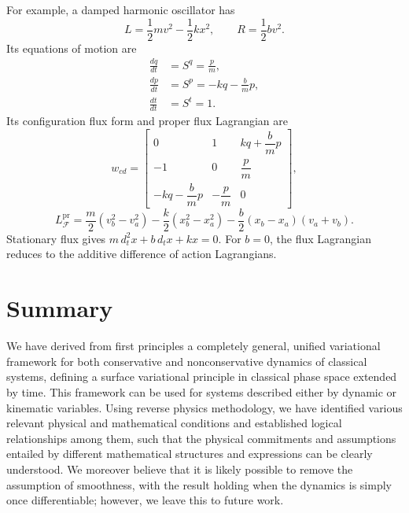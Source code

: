 \documentclass[nofootinbib,aps,pre]{revtex4-2}
\begin{document}
For example, a damped harmonic oscillator has
\begin{equation}
	L=\frac12 mv^2-\frac12 kx^2,
	\qquad R=\frac12 bv^2.
\end{equation}
Its equations of motion are
\begin{equation}
	\begin{aligned}
		\frac{dq}{dt}&=S^q=\frac{p}{m},\\
		\frac{dp}{dt}&=S^p=-kq-\frac{b}{m}p,\\
		\frac{dt}{dt}&=S^t=1.
	\end{aligned}
\end{equation}
Its configuration flux form and proper flux Lagrangian are
\begin{equation}
	w_{cd}=
	\begin{bmatrix}
		0 & 1 & kq+\dfrac{b}{m}p\\
		-1 & 0 & \dfrac{p}{m}\\
		-kq-\dfrac{b}{m}p & -\dfrac{p}{m} & 0
	\end{bmatrix},
\end{equation}
\begin{equation}
	L_{\mathcal F}^{\mathrm{pr}}
	=\frac m2(v_b^2-v_a^2)
	-\frac k2(x_b^2-x_a^2)
	-\frac b2(x_b-x_a)(v_a+v_b).
\end{equation}
Stationary flux gives $m\,d_t^2x+b\,d_t x+kx=0$.
For $b=0$, the flux Lagrangian reduces to the additive difference
of action Lagrangians.

\section{Summary}
\label{sec:summary}
We have derived from first principles a completely general, unified variational framework for both conservative and nonconservative dynamics of classical systems, defining a surface variational principle in classical phase space extended by time.  This framework can be used for systems described either by dynamic or kinematic variables.  Using reverse physics methodology, we have identified various relevant physical and mathematical conditions and established logical relationships among them, such that the physical commitments and assumptions entailed by different mathematical structures and expressions can be clearly understood.  We moreover believe that it is likely possible to remove the assumption of smoothness, with the result holding when the dynamics is simply once differentiable; however, we leave this to future work.  


\end{document}
